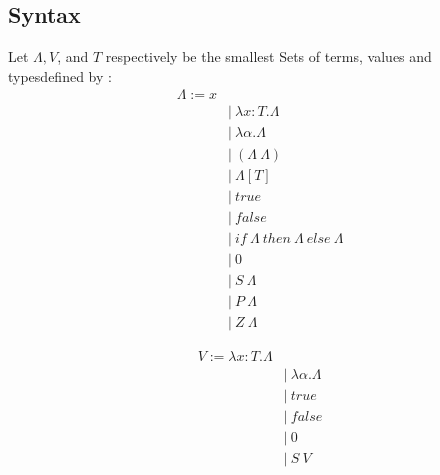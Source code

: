 \documentclass{article}
\begin{document}
    \subsection{Syntax}\label{syntax}
    Let $\Lambda,  V$, and $T$ respectively be the smallest Sets of terms, values and typesdefined by :
    \begin{align}
        \Lambda := x \tag{variable}\\     
      &|\ \lambda x : T.\Lambda \tag{term abstraction}\\
      &|\ \lambda \alpha.\Lambda \tag{type abstraction}\\
      &|\ (\Lambda \ \Lambda) \tag{term application}\\
      &|\ \Lambda[ T ] \tag{type application}\\
      &|\ true \tag{true}\\
      &|\ false \tag{false}\\
      &|\ if \ \Lambda \  then \  \Lambda \  else \  \Lambda \tag{If then else}\\
      &|\ 0 \tag{Zero}\\
      &|\ S \ \Lambda \tag{Successor}\\
      &|\ P \ \Lambda \tag{Predecessor}\\
      &|\ Z \ \Lambda \tag{Zero predicate}
    \end{align}

    \begin{align}
        V :=  \lambda x : T.\Lambda \tag{term abstraction}\\
    &|\ \lambda \alpha.\Lambda \tag{type abstraction}\\
    &|\ true \tag{Boolean value : true}\\
    &|\ false \tag{Boolean value : false}\\
    &|\ 0 \tag{Natural value : Zero}\\
    &|\ S \ V \tag{Natural value : Non-zero natural number}
    \end{align}
\end{document}
